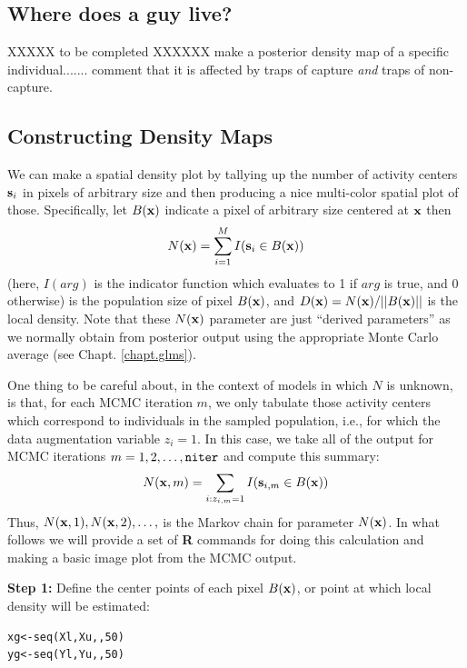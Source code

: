 \subsection{Where does a guy live?}

XXXXX to be completed XXXXXX
make a posterior density map of a specific individual.......
comment that it is affected by traps of capture {\it and} traps of
non-capture.


\subsection{Constructing Density Maps}
\label{scr0.sec.mapping}

We can make a spatial density plot by
tallying up the number of activity centers ${\bf s}_{i}$ in pixels of
arbitrary size and then producing a nice multi-color spatial plot of
those.
Specifically, let $B({\bf x})$ indicate a pixel of arbitrary size centered at
${\bf x}$ then
\[
N({\bf x})=\sum_{i=1}^{M} I({\bf s}_{i} \in B({\bf x}))
\]
(here, $I(arg)$ is the indicator function which evaluates to 1 if
$arg$ is true, and 0 otherwise)
is the population size of pixel  $B({\bf x})$, and $D({\bf x}) = N({\bf
  x})/||B({\bf x})||$ is the local density.
Note that these $N({\bf x})$ parameter are just ``derived
parameters'' as we normally obtain from posterior output using the
appropriate Monte Carlo average (see Chapt.  \ref{chapt.glms}).

One thing to be
careful about, in the context of models in which $N$ is unknown, is
that, for each MCMC iteration $m$, we only tabulate those activity
centers which correspond to individuals in the sampled
population, i.e., for which the data augmentation variable $z_{i} =
1$.  In this case, we take all of the output for MCMC iterations
$m=1,2,\ldots,\mbox{\tt niter}$ and compute this summary:
\[
   N({\bf x},m) = \sum_{i: z_{i,m}=1} I({\bf s}_{i,m} \in B({\bf x}))
\]
Thus, $N({\bf x},1),N({\bf x},2),\dots,$ is the Markov chain for
parameter $N({\bf x})$.  In what follows we will provide a set of {\bf
  R} commands for doing this calculation and making a basic image
plot from the MCMC output.

{\flushleft \bf Step 1:} Define the center points of each pixel $B({\bf
  x})$, or point at which local density will be estimated:
\begin{verbatim}
xg<-seq(Xl,Xu,,50)
yg<-seq(Yl,Yu,,50)
\end{verbatim}

